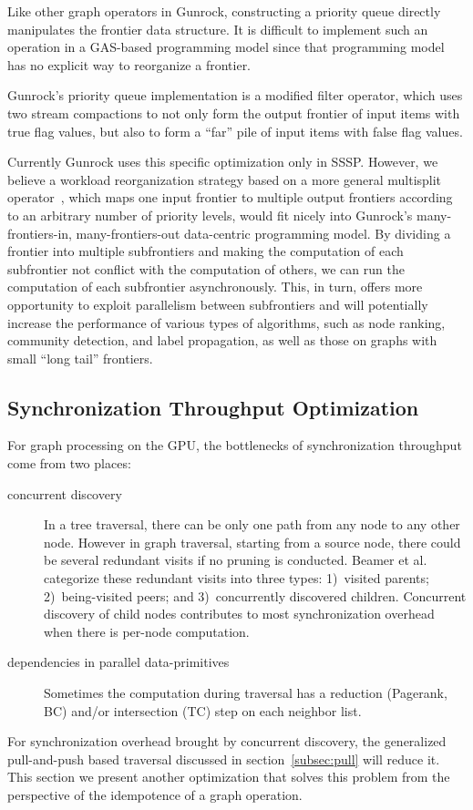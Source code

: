 \documentclass[format=acmsmall,review=false,screen=true]{acmart}
\begin{document}
Like other graph operators in Gunrock, constructing a priority queue
directly manipulates the frontier data structure. It is difficult to
implement such an operation in a GAS-based programming model since
that programming model has no explicit way to reorganize a frontier.

Gunrock's priority queue implementation is a modified filter operator,
which uses two stream compactions to not only form the output frontier
of input items with true flag values, but also to form a ``far'' pile
of input items with false flag values.

Currently Gunrock uses this specific optimization only in SSSP\@.
However, we believe a workload reorganization strategy based on a more
general multisplit operator~\cite{Ashkiani:2016:GM}, which maps one
input frontier to multiple output frontiers according to an arbitrary
number of priority levels, would fit nicely into Gunrock's
many-frontiers-in, many-frontiers-out data-centric programming model.
By dividing a frontier into multiple subfrontiers and making the computation
of each subfrontier not conflict with the computation of others, we can run
the computation of each subfrontier asynchronously.
This, in turn, offers more opportunity to exploit parallelism between
subfrontiers and will potentially increase the performance of
various types of algorithms, such as node ranking, community
detection, and label propagation, as well as those on graphs with
small ``long tail'' frontiers.

\subsection{Synchronization Throughput Optimization}
\label{sec:sync}
For graph processing on the GPU, the bottlenecks of synchronization
throughput come from two places:
\begin{description}
\item[concurrent discovery] In a tree traversal, there can be only one
  path from any node to any other node. However in graph traversal,
  starting from a source node, there could be several redundant visits
  if no pruning is conducted. Beamer et
  al.~ categorize these redundant visits
  into three types: 1)~visited parents; 2)~being-visited peers; and
  3)~concurrently discovered children. Concurrent discovery of child
  nodes contributes to most synchronization overhead when there is
  per-node computation.
\item[dependencies in parallel data-primitives] Sometimes the
  computation during traversal has a reduction (Pagerank, BC) and/or
  intersection (TC) step on each neighbor list.
\end{description}
For synchronization overhead brought by concurrent discovery, the
generalized pull-and-push based traversal discussed in
section~\ref{subsec:pull} will reduce it. This section we present
another optimization that solves this problem from the perspective of
the idempotence of a graph operation.
\end{document}
